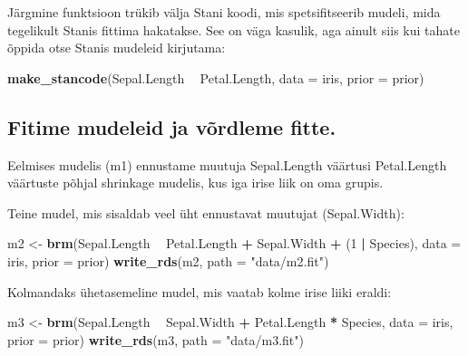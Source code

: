 \documentclass[]{book}
\newenvironment{Shaded}{\begin{snugshade}}{\end{snugshade}}
\newcommand{\DataTypeTok}[1]{\textcolor[rgb]{0.13,0.29,0.53}{#1}}
\newcommand{\DecValTok}[1]{\textcolor[rgb]{0.00,0.00,0.81}{#1}}
\newcommand{\KeywordTok}[1]{\textcolor[rgb]{0.13,0.29,0.53}{\textbf{#1}}}
\newcommand{\NormalTok}[1]{#1}
\newcommand{\OperatorTok}[1]{\textcolor[rgb]{0.81,0.36,0.00}{\textbf{#1}}}
\newcommand{\StringTok}[1]{\textcolor[rgb]{0.31,0.60,0.02}{#1}}
\begin{document}
Järgmine funktsioon trükib välja Stani koodi, mis spetsifitseerib mudeli, mida tegelikult Stanis fittima hakatakse. See on väga kasulik, aga ainult siis kui tahate õppida otse Stanis mudeleid kirjutama:

\begin{Shaded}
\begin{Highlighting}[]
\KeywordTok{make_stancode}\NormalTok{(Sepal.Length }\OperatorTok{~}\StringTok{ }\NormalTok{Petal.Length, }\DataTypeTok{data =}\NormalTok{ iris, }\DataTypeTok{prior =}\NormalTok{ prior)}
\end{Highlighting}
\end{Shaded}

\hypertarget{fitime-mudeleid-ja-vordleme-fitte.}{%
\subsection{Fitime mudeleid ja võrdleme fitte.}\label{fitime-mudeleid-ja-vordleme-fitte.}}

Eelmises mudelis (m1) ennustame muutuja Sepal.Length väärtusi Petal.Length väärtuste põhjal shrinkage mudelis, kus iga irise liik on oma grupis.

Teine mudel, mis sisaldab veel üht ennustavat muutujat (Sepal.Width):

\begin{Shaded}
\begin{Highlighting}[]
\NormalTok{m2 <-}\StringTok{ }\KeywordTok{brm}\NormalTok{(Sepal.Length }\OperatorTok{~}\StringTok{ }\NormalTok{Petal.Length }\OperatorTok{+}\StringTok{ }\NormalTok{Sepal.Width }\OperatorTok{+}\StringTok{ }\NormalTok{(}\DecValTok{1} \OperatorTok{|}\StringTok{ }\NormalTok{Species), }
          \DataTypeTok{data =}\NormalTok{ iris, }
          \DataTypeTok{prior =}\NormalTok{ prior)}
\KeywordTok{write_rds}\NormalTok{(m2, }\DataTypeTok{path =} \StringTok{"data/m2.fit"}\NormalTok{)}
\end{Highlighting}
\end{Shaded}

Kolmandaks ühetasemeline mudel, mis vaatab kolme irise liiki eraldi:

\begin{Shaded}
\begin{Highlighting}[]
\NormalTok{m3 <-}\StringTok{ }\KeywordTok{brm}\NormalTok{(Sepal.Length }\OperatorTok{~}\StringTok{ }\NormalTok{Sepal.Width }\OperatorTok{+}\StringTok{ }\NormalTok{Petal.Length }\OperatorTok{*}\StringTok{ }\NormalTok{Species, }
          \DataTypeTok{data =}\NormalTok{ iris, }
          \DataTypeTok{prior =}\NormalTok{ prior)}
\KeywordTok{write_rds}\NormalTok{(m3, }\DataTypeTok{path =} \StringTok{"data/m3.fit"}\NormalTok{)}
\end{Highlighting}
\end{Shaded}
\end{document}
